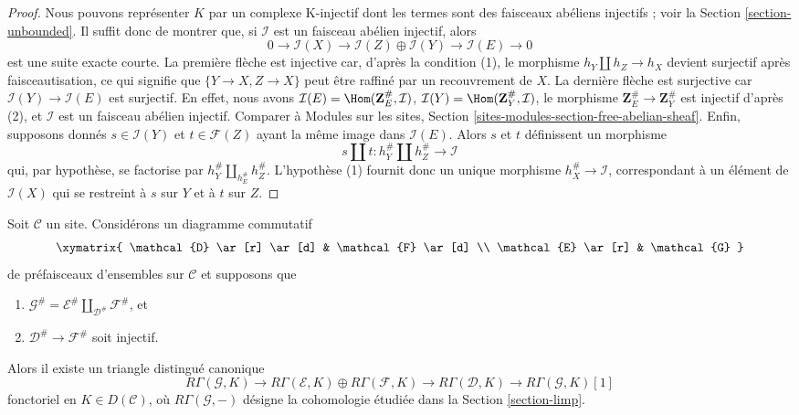 \begin{proof}
Nous pouvons représenter $K$ par un complexe K-injectif dont les termes
sont des faisceaux abéliens injectifs ; voir la Section
\ref{section-unbounded}. Il suffit donc de montrer que, si $\mathcal{I}$
est un faisceau abélien injectif, alors
$$
0 \to \mathcal{I}(X) \to
\mathcal{I}(Z) \oplus \mathcal{I}(Y) \to
\mathcal{I}(E) \to 0
$$
est une suite exacte courte. La première flèche est injective car, d'après
la condition (1), le morphisme $h_Y \amalg h_Z \to h_X$ devient surjectif
après faisceautisation, ce qui signifie que
$\{Y \to X, Z \to X\}$ peut être raffiné par un recouvrement de $X$. La
dernière flèche est surjective car
$\mathcal{I}(Y) \to \mathcal{I}(E)$ est surjectif. En effet, nous avons
$\mathcal{I}(E) = \Hom(\mathbf{Z}_E^\#, \mathcal{I})$,
$\mathcal{I}(Y) = \Hom(\mathbf{Z}_Y^\#, \mathcal{I})$,
le morphisme $\mathbf{Z}_E^\# \to \mathbf{Z}_Y^\#$ est injectif d'après
(2), et $\mathcal{I}$ est un faisceau abélien injectif. Comparer à Modules
sur les sites, Section
\ref{sites-modules-section-free-abelian-sheaf}.
Enfin, supposons donnés $s \in \mathcal{I}(Y)$ et
$t \in \mathcal{F}(Z)$ ayant la même image dans $\mathcal{I}(E)$. Alors
$s$ et $t$ définissent un morphisme
$$
s \amalg t : h_Y^\# \amalg h_Z^\# \longrightarrow \mathcal{I}
$$
qui, par hypothèse, se factorise par
$h_Y^\# \amalg_{h_E^\#} h_Z^\#$. L'hypothèse (1) fournit donc un unique
morphisme $h_X^\# \to \mathcal{I}$, correspondant à un élément de
$\mathcal{I}(X)$ qui se restreint à $s$ sur $Y$ et à $t$ sur $Z$.
\end{proof}

\begin{lemma}
\label{lemma-square-triangle-general}
Soit $\mathcal{C}$ un site. Considérons un diagramme commutatif
$$
\xymatrix{
\mathcal{D} \ar[r] \ar[d] & \mathcal{F} \ar[d] \\
\mathcal{E} \ar[r] & \mathcal{G}
}
$$
de préfaisceaux d'ensembles sur $\mathcal{C}$ et supposons que
\begin{enumerate}
\item $\mathcal{G}^\# =
\mathcal{E}^\# \amalg_{\mathcal{D}^\#} \mathcal{F}^\#$, et
\item $\mathcal{D}^\# \to \mathcal{F}^\#$ soit injectif.
\end{enumerate}
Alors il existe un triangle distingué canonique
$$
R\Gamma(\mathcal{G}, K) \to
R\Gamma(\mathcal{E}, K) \oplus
R\Gamma(\mathcal{F}, K) \to
R\Gamma(\mathcal{D}, K) \to
R\Gamma(\mathcal{G}, K)[1]
$$
fonctoriel en $K \in D(\mathcal{C})$, où $R\Gamma(\mathcal{G}, -)$ désigne
la cohomologie étudiée dans la Section \ref{section-limp}.
\end{lemma}

